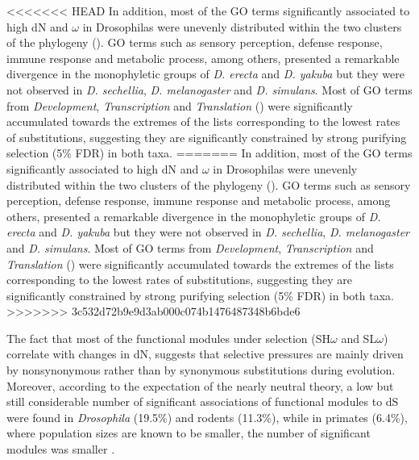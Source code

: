 <<<<<<< HEAD
In addition, most of the GO terms significantly associated to high dN and $\omega$ in  Drosophilas were unevenly distributed within the two clusters of the phylogeny (). GO terms such as sensory perception, defense response, immune response and metabolic process, among others, presented a remarkable divergence in the monophyletic groups of \textit{D. erecta} and \textit{D. yakuba} but they were not observed in \textit{D. sechellia}, \textit{D. melanogaster} and \textit{D. simulans}. Most of GO terms from \textit{Development}, \textit{Transcription} and \textit{Translation} () were significantly accumulated towards the extremes of the lists corresponding to the lowest rates of substitutions, suggesting they are significantly constrained by strong purifying selection (5\% FDR) in both taxa.
=======
In addition, most of the GO terms significantly associated to high dN and $\omega$ in Drosophilas were unevenly distributed within the two clusters of the phylogeny (). GO terms such as sensory perception, defense response, immune response and metabolic process, among others, presented a remarkable divergence in the monophyletic groups of \textit{D. erecta} and \textit{D. yakuba} but they were not observed in \textit{D. sechellia}, \textit{D. melanogaster} and \textit{D. simulans}. Most of GO terms from \textit{Development}, \textit{Transcription} and \textit{Translation} () were significantly accumulated towards the extremes of the lists corresponding to the lowest rates of substitutions, suggesting they are significantly constrained by strong purifying selection (5\% FDR) in both taxa.
>>>>>>> 3c532d72b9e9d3ab000c074b1476487348b6bde6

The fact that most of the functional modules under selection (SH$\omega$ and SL$\omega$) correlate with changes in dN, suggests that selective pressures are mainly driven by nonsynonymous rather than by synonymous substitutions during evolution. Moreover, according to the expectation of the nearly neutral theory, a low but still considerable number of significant associations of functional modules to dS were found in \textit{Drosophila} (19.5\%) and rodents (11.3\%), while in primates (6.4\%), where population sizes are known to be smaller, the number of significant modules was smaller \cite{Petit2009}.

